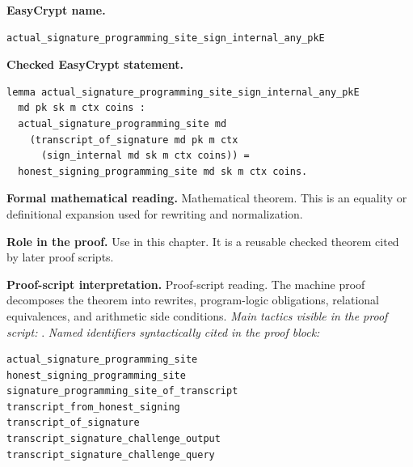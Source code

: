 \begin{formaltheorem}
\noindent\textbf{EasyCrypt name.}
\begin{lstlisting}[language=EasyCrypt,basicstyle=\ttfamily\scriptsize]
actual_signature_programming_site_sign_internal_any_pkE
\end{lstlisting}
\noindent\textbf{Checked EasyCrypt statement.}
\begin{lstlisting}[language=EasyCrypt,basicstyle=\ttfamily\scriptsize]
lemma actual_signature_programming_site_sign_internal_any_pkE
  md pk sk m ctx coins :
  actual_signature_programming_site md
    (transcript_of_signature md pk m ctx
      (sign_internal md sk m ctx coins)) =
  honest_signing_programming_site md sk m ctx coins.
\end{lstlisting}
\noindent\textbf{Formal mathematical reading.}
Mathematical theorem. This is an equality or definitional expansion used for rewriting and normalization.

\noindent\textbf{Role in the proof.}
Use in this chapter. It is a reusable checked theorem cited by later proof scripts.

\noindent\textbf{Proof-script interpretation.}
Proof-script reading. The machine proof decomposes the theorem into rewrites, program-logic obligations, relational equivalences, and arithmetic side conditions.
\emph{Main tactics visible in the proof script:} .
\emph{Named identifiers syntactically cited in the proof block:}
\begin{lstlisting}[language=EasyCrypt,basicstyle=\ttfamily\scriptsize]
actual_signature_programming_site
honest_signing_programming_site
signature_programming_site_of_transcript
transcript_from_honest_signing
transcript_of_signature
transcript_signature_challenge_output
transcript_signature_challenge_query
\end{lstlisting}

\end{formaltheorem}

